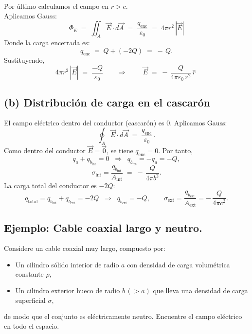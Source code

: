 \documentclass[a4paper,12pt]{article}
\begin{document}
\medskip
\noindent
Por último calculamos el campo en \(r>c\).\\
Aplicamos Gauss:
\[
\Phi_E \;=\; \iint_{A} \vec E\!\cdot d\vec A
\;=\; \frac{q_{\text{enc}}}{\varepsilon_{0}}
\;=\; 4\pi r^{2}\,|\vec E|
\]
Donde la carga encerrada es:
\[
q_{\text{enc}} \;=\; Q + (-2Q) \;=\; -\,Q .
\]
Sustituyendo,
\[
4\pi r^{2}\,|\vec E| \;=\; \frac{-Q}{\varepsilon_{0}}
\qquad\Longrightarrow\qquad
\boxed{\; \vec E \;=\; -\,\frac{Q}{4\pi \varepsilon_{0}\,r^{2}}\,\hat r \;}
\]
\subsection*{(b) Distribución de carga en el cascarón}
\noindent
El campo eléctrico dentro del conductor (cascarón) es \(0\). Aplicamos Gauss:
\[
\oint_{A} \vec E\cdot d\vec A \;=\; \frac{q_{\text{enc}}}{\varepsilon_0}\,.
\]
Como dentro del conductor \( \vec E=\vec 0 \), se tiene \( q_{\text{enc}}=0 \). Por tanto,
\[
q_a + q_{b_{\text{int}}} = 0 \;\;\Longrightarrow\;\; q_{b_{\text{int}}}=-q_a=-Q,
\]
\[
\sigma_{\text{int}}=\frac{q_{b_{\text{int}}}}{A_{\text{int}}} \;=\; -\,\frac{Q}{4\pi b^{2}}.
\]
La carga total del conductor es \(-2Q\):
\[
q_{\text{total}} = q_{b_{\text{int}}}+q_{b_{\text{ext}}}=-2Q
\;\;\Longrightarrow\;\;
q_{b_{\text{ext}}}=-Q,
\qquad
\sigma_{\text{ext}}=\frac{q_{b_{\text{ext}}}}{A_{\text{ext}}}=-\,\frac{Q}{4\pi c^{2}}.
\]

\subsection*{Ejemplo: Cable coaxial largo y neutro.}
\noindent
Considere un cable coaxial muy largo, compuesto por:
\begin{itemize}[leftmargin=1.2em]
  \item Un cilindro sólido interior de radio \(a\) con densidad de carga volumétrica constante \(\rho\),
  \item Un cilindro exterior hueco de radio \(b\,(>a)\) que lleva una densidad de carga superficial \(\sigma\),
\end{itemize}
de modo que el conjunto es eléctricamente neutro. Encuentre el campo eléctrico en todo el espacio.
\end{document}

